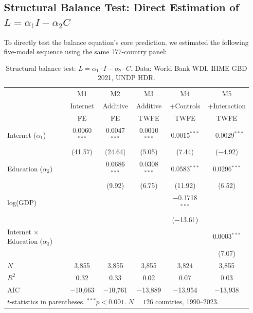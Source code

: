 \documentclass[a4paper,11pt,titlepage]{article}
\begin{document}
\subsection{Structural Balance Test: Direct Estimation of $L = \alpha_1 I - \alpha_2 C$}\label{sec:structural-balance}

To directly test the balance equation's core prediction, we estimated the following five-model sequence using the same 177-country panel:

\begin{table}[htbp]
\centering
\caption{Structural balance test: $L = \alpha_1 \cdot I - \alpha_2 \cdot C$. Data: World Bank WDI, IHME GBD 2021, UNDP HDR.}
\label{tab:structural-balance}
\small
\begin{tabular}{lccccc}
\toprule
& M1 & M2 & M3 & M4 & M5 \\
& Internet & Additive & Additive & +Controls & +Interaction \\
& FE & FE & TWFE & TWFE & TWFE \\
\midrule
Internet ($\alpha_1$) & 0.0060$^{***}$ & 0.0047$^{***}$ & 0.0010$^{***}$ & 0.0015$^{***}$ & $-$0.0029$^{***}$ \\
& (41.57) & (24.64) & (5.05) & (7.44) & ($-$4.92) \\
Education ($\alpha_2$) &  & 0.0686$^{***}$ & 0.0308$^{***}$ & 0.0583$^{***}$ & 0.0296$^{***}$ \\
&  & (9.92) & (6.75) & (11.92) & (6.52) \\
log(GDP) &  &  &  & $-$0.1718$^{***}$ &  \\
&  &  &  & ($-$13.61) &  \\
Internet $\times$ Education ($\alpha_3$) &  &  &  &  & 0.0003$^{***}$ \\
&  &  &  &  & (7.07) \\
\midrule
$N$ & 3,855 & 3,855 & 3,855 & 3,824 & 3,855 \\
$R^2$ & 0.32 & 0.33 & 0.02 & 0.07 & 0.03 \\
AIC & $-$10,663 & $-$10,761 & $-$13,889 & $-$13,954 & $-$13,938 \\
\bottomrule
\multicolumn{6}{l}{\scriptsize $t$-statistics in parentheses. $^{***}p < 0.001$. $N = 126$ countries, 1990--2023.}
\end{tabular}
\end{table}
\end{document}
